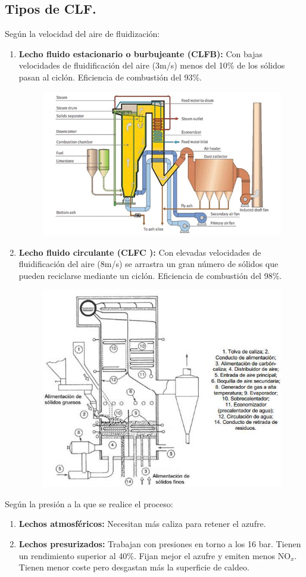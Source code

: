 \subsection{Tipos de CLF.}
Según la velocidad del aire de fluidización:
\begin{enumerate}
	\item \textbf{Lecho fluido estacionario o burbujeante (CLFB):}
		Con bajas velocidades de fluidificación del aire (3m/s) menos del 10\% de los sólidos pasan al ciclón. Eficiencia de combustión del 93\%.
	\begin{figure}[H]
		\centering
		\includegraphics[width=0.7\linewidth]{res/tema3/clfb}
		\label{fig:clfb}
	\end{figure}
	
	\item \textbf{Lecho fluido circulante (CLFC ):}
			Con elevadas velocidades de fluidificación del aire (8m/s) se arrastra un gran número de sólidos que pueden reciclarse mediante un ciclón. Eficiencia de combustión del 98\%.
	\begin{figure}[H]
		\centering
		\includegraphics[width=0.7\linewidth]{res/tema3/CLFC}
		\label{fig:clfc}
	\end{figure}
	
\end{enumerate}
Según la presión a la que se realice el proceso:
\begin{enumerate}
	\item \textbf{Lechos atmosféricos:} Necesitan más caliza para retener el azufre.
	\item \textbf{Lechos presurizados:} Trabajan con presiones en torno a los 16 bar. Tienen un rendimiento superior al 40\%. Fijan mejor el azufre y emiten menos NO$_x$. Tienen menor coste pero desgastan más la superficie de caldeo.
\end{enumerate}
\newpage
